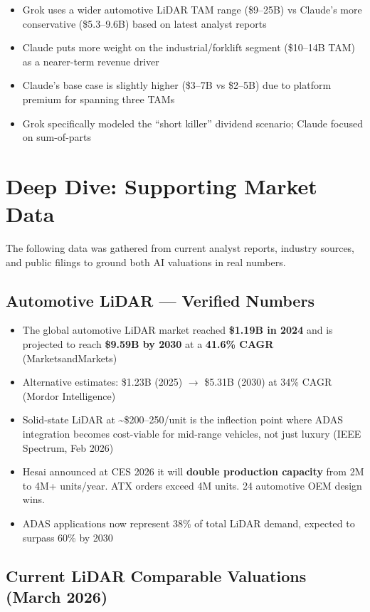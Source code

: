 \documentclass[11pt,letterpaper]{article}
\begin{document}
\begin{itemize}
\item Grok uses a wider automotive LiDAR TAM range (\$9--25B) vs Claude's more conservative (\$5.3--9.6B) based on latest analyst reports
\item Claude puts more weight on the industrial/forklift segment (\$10--14B TAM) as a nearer-term revenue driver
\item Claude's base case is slightly higher (\$3--7B vs \$2--5B) due to platform premium for spanning three TAMs
\item Grok specifically modeled the ``short killer'' dividend scenario; Claude focused on sum-of-parts
\end{itemize}

\section{Deep Dive: Supporting Market Data}

The following data was gathered from current analyst reports, industry sources, and public filings to ground both AI valuations in real numbers.

\subsection{Automotive LiDAR --- Verified Numbers}

\begin{itemize}
\item The global automotive LiDAR market reached \textbf{\$1.19B in 2024} and is projected to reach \textbf{\$9.59B by 2030} at a \textbf{41.6\% CAGR} (MarketsandMarkets)
\item Alternative estimates: \$1.23B (2025) $\rightarrow$ \$5.31B (2030) at 34\% CAGR (Mordor Intelligence)
\item Solid-state LiDAR at \textasciitilde\$200--250/unit is the inflection point where ADAS integration becomes cost-viable for mid-range vehicles, not just luxury (IEEE Spectrum, Feb 2026)
\item Hesai announced at CES 2026 it will \textbf{double production capacity} from 2M to 4M+ units/year. ATX orders exceed 4M units. 24 automotive OEM design wins.
\item ADAS applications now represent 38\% of total LiDAR demand, expected to surpass 60\% by 2030
\end{itemize}

\subsection{Current LiDAR Comparable Valuations (March 2026)}
\end{document}
